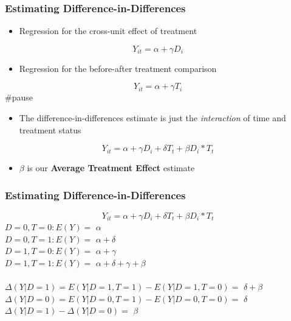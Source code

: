\documentclass[xcolor=x11names,compress]{beamer}\usepackage[]{graphicx}\usepackage[]{color}
\renewcommand{\(}{\begin{columns}}
\renewcommand{\)}{\end{columns}}
\newcommand{\<}[1]{\begin{column}{#1}}
\renewcommand{\>}{\end{column}}
\begin{document}
\begin{frame}
\frametitle{Estimating Difference-in-Differences}
\begin{itemize}
\item Regression for the cross-unit effect of treatment
\end{itemize}
$$ Y_{it} = \alpha + \gamma D_i$$
\pause
\begin{itemize}
\item Regression for the before-after treatment comparison
\end{itemize}
$$ Y_{it} = \alpha + \gamma T_i$$
#pause
\begin{itemize}
\item The difference-in-differences estimate is just the \textit{interaction} of time and treatment status
\end{itemize}
$$ Y_{it} = \alpha + \gamma D_i + \delta T_t + \beta D_i * T_t $$
\begin{itemize}
\item $\beta$ is our \textbf{Average Treatment Effect} estimate
\end{itemize}
\end{frame}

\begin{frame}
\frametitle{Estimating Difference-in-Differences}
$$ Y_{it} = \alpha + \gamma D_i + \delta T_t + \beta D_i * T_t $$
\pause
\vspace*{10px}
$D=0, T=0: E(Y)=$ \pause $\alpha$ \\
\pause
$D=0, T=1: E(Y)=$ \pause $\alpha + \delta$ \\
\pause
$D=1, T=0: E(Y)=$ \pause $\alpha + \gamma$ \\
\pause
$D=1, T=1: E(Y)=$ \pause $\alpha + \delta + \gamma + \beta$ \\ \\
\vspace*{20px}
\pause
$\Delta(Y|D=1) = E(Y|D=1, T=1) - E(Y|D=1, T=0) =$ \pause $ \delta + \beta$ \\
\pause
$\Delta(Y|D=0) = E(Y|D=0, T=1) - E(Y|D=0, T=0) =$ \pause $ \delta$ \\
\pause
\vspace*{20px}
$\Delta(Y|D=1) - \Delta(Y|D=0) =$ \pause $\beta$
\end{frame}
\end{document}
